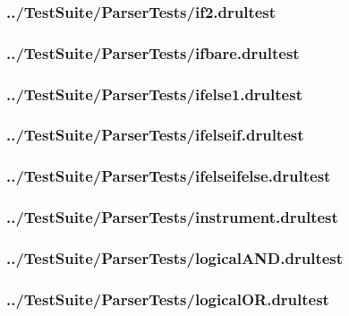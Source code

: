 \begin{changemargin}{-1in}{-1in}
\subsubsection{../TestSuite/ParserTests/if2.drultest}


\subsubsection{../TestSuite/ParserTests/ifbare.drultest}


\subsubsection{../TestSuite/ParserTests/ifelse1.drultest}


\subsubsection{../TestSuite/ParserTests/ifelseif.drultest}


\subsubsection{../TestSuite/ParserTests/ifelseifelse.drultest}


\subsubsection{../TestSuite/ParserTests/instrument.drultest}


\subsubsection{../TestSuite/ParserTests/logicalAND.drultest}


\subsubsection{../TestSuite/ParserTests/logicalOR.drultest}



\end{changemargin}
